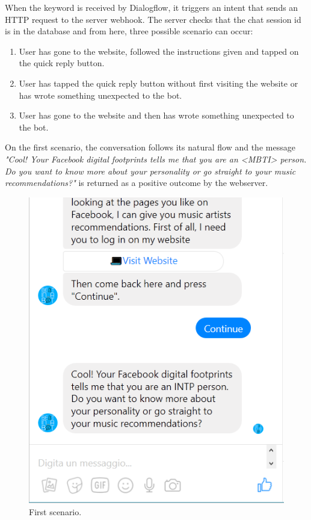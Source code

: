 \documentclass[b5paper,10pt,twoside,cucitura]{toptesi}
\begin{document}
When the keyword is received by Dialogflow, it triggers an intent that sends an HTTP request to the server webhook. The server checks that the chat session id is in the database and from here, three possible scenario can occur:

\begin{enumerate}
    \item User has gone to the website, followed the instructions given and tapped on the quick reply button.
    \item User has tapped the quick reply button without first visiting the website or has wrote something unexpected to the bot.
    \item User has gone to the website and then has wrote something unexpected to the bot.
\end{enumerate}

\noindent
On the first scenario, the conversation follows its natural flow and the message \textit{"Cool! Your Facebook digital footprints tells me that you are an <MBTI> person. Do you want to know more about your personality or go straight to your music recommendations?"} is returned as a positive outcome by the webserver.

\begin{figure}[ht]
\centering
\includegraphics[scale=0.7]{bot_positive.png}
\caption{First scenario.}
\end{figure}
\end{document}
